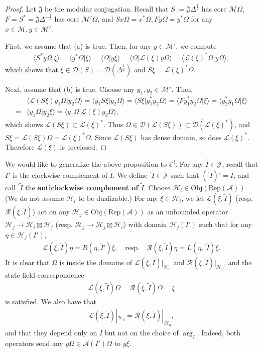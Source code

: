 \documentclass[12pt,a4paper]{article}
\theoremstyle{definition}
\theoremstyle{plain}
\newcommand{\fk}{\mathfrak}
\newcommand{\mc}{\mathcal}
\newcommand{\wtd}{\widetilde}
\newcommand{\Dom}{\scr D}
\newcommand{\bk}[1]{\langle {#1}\rangle}
\newcommand{\scr}{\mathscr}
\newcommand{\Jtd}{\widetilde{\mathcal J}}
\newcommand{\RepA}{\mathrm{Rep}(\mc A)}
\newcommand{\Obj}{\mathrm{Obj}}
\newcommand{\Ef}{\mathscr E^{\mathrm f}}
\newcommand{\bpr}{{}^\backprime}
\numberwithin{equation}{section}
\begin{document}
\begin{proof}
Let $\fk J$ be the modular conjugation. Recall that $S:=\fk J\Delta^{\frac 12}$ has core $\mc M\Omega$, $F=S^*=\fk J\Delta^{-\frac 12}$ has core $\mc M'\Omega$, and $Sx\Omega=x^*\Omega,Fy\Omega=y^*\Omega$ for any $x\in\mc M,y\in\mc M'$.

First, we assume that (a) is true. Then, for any $y\in\mc M'$, we compute
\begin{align*}
\bk{S^*y\Omega|\xi}=\bk{y^*\Omega|\xi}=\bk{\Omega|y\xi}=\bk{\Omega|\scr L(\xi)y\Omega}=\bk{\scr L(\xi)^*\Omega|y\Omega},
\end{align*}
which shows that $\xi\in\Dom(S)=\Dom(\Delta^{\frac 12})$ and $S\xi=\scr L(\xi)^*\Omega$.

Next, assume that (b) is true. Choose any $y_1,y_2\in\mc M'$. Then
\begin{align*}
&\bk{\scr L(S\xi)y_1\Omega|y_2\Omega}=\bk{y_1S\xi|y_2\Omega}=\bk{S\xi|y_1^*y_2\Omega}=\bk{Fy_1^*y_2\Omega|\xi}=\bk{y_2^*y_1\Omega|\xi}\\
=&\bk{y_1\Omega|y_2\xi}=\bk{y_1\Omega|\scr L(\xi)y_2\Omega},
\end{align*}
which shows $\scr L(S\xi)\subset\scr L(\xi)^*$. Thus  $\Omega\in\Dom(\scr L(S\xi))\subset\Dom(\scr L(\xi)^*)$, and $S\xi=\scr L(S\xi)\Omega=\scr L(\xi)^*\Omega$. Since $\scr L(S\xi)$ has dense domain, so does $\scr L(\xi)^*$. Therefore $\scr L(\xi)$ is preclosed.
\end{proof}


We would like to generalize the above proposition to $\Ef$. For any $\wtd I\in\Jtd$, recall that $\wtd I'$ is the clockwise complement of $\wtd I$. We define ${\bpr\wtd I}\in\Jtd$ such that $(\bpr\wtd I)'=\wtd I$, and call ${\bpr\wtd I}$ the \textbf{anticlockwise complement of $\wtd I$}. Choose $\mc H_i\in\Obj(\RepA)$. (We do not assume $\mc H_i$ to be dualizable.)  For any $\xi\in\mc H_i$, we let $\scr L(\xi,\wtd I)$ (resp. $\scr R(\xi,\wtd I)$) act on any $\mc H_j\in\Obj(\RepA)$ as an unbounded operator $\mc H_j\rightarrow\mc H_i\boxtimes\mc H_j$ (resp. $\mc H_j\rightarrow\mc H_j\boxtimes\mc H_i$) with domain $\mc H_j(I')$ such that for any $\eta\in\mc H_j(I')$,
\begin{align}
\scr L(\xi,\wtd I)\eta=R(\eta,\wtd I')\xi,\quad \text{resp.}  \quad \scr R(\xi,\wtd I)\eta=L(\eta,\bpr\wtd I)\xi.
\end{align}
It is clear that $\Omega$ is inside the domains of $\scr L(\xi,\wtd I)|_{\mc H_0}$ and $\scr R(\xi,\wtd I)|_{\mc H_0}$, and the state-field correspondence
\begin{align}
\scr L(\xi,\wtd I)\Omega=\scr R(\xi,\wtd I)\Omega=\xi
\end{align}
is satisfied. We also have that
\begin{align}
\scr L(\xi,\wtd I)|_{\mc H_0}=\scr R(\xi,\wtd I)|_{\mc H_0},
\end{align}
and that they depend only on $I$ but not on the choice of $\arg_I$. Indeed, both operators send any $y\Omega\in\mc A(I')\Omega$ to $y\xi$.
\end{document}
